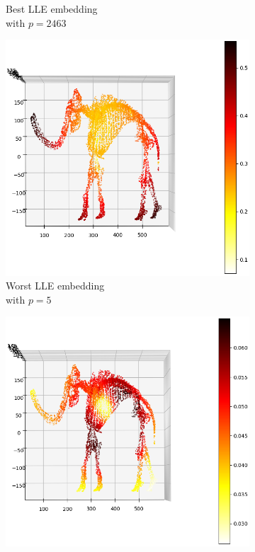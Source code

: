 \begin{figure}[!]
\begin{subfigure}[t]{0.49\columnwidth}
    	\caption{Best LLE embedding \\ with $p=2463$}
        \label{fig:reverse_best_lle_mammoth}
    \end{subfigure}
     \hfill
     \begin{subfigure}[t]{0.49\columnwidth}
    	\centering
    	\includegraphics[width=\columnwidth]{images/reverse_worst_lle_mammoth.png}
    	\caption{Worst LLE embedding \\ with $p=5$}
        \label{fig:reverse_worst_lle_mammoth}
    \end{subfigure}
     \hfill
     \begin{subfigure}[t]{0.49\columnwidth}
    	\centering
    	\includegraphics[width=\columnwidth]{images/reverse_best_tsne_mammoth.png}

\end{subfigure}
\end{figure}
